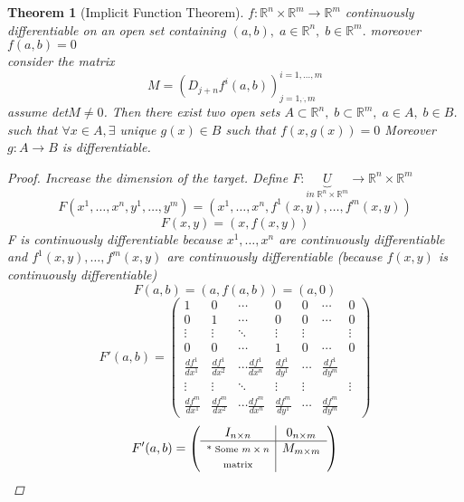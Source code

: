 \documentclass[12pt]{article}
\def\RR{\mathbb{R}}
\newtheorem{theorem}{Theorem}[section]
\begin{document}
\begin{theorem}[Implicit Function Theorem]\label{implicitFunction}
$f:\RR^n \times \RR^m \rightarrow \RR^m$ continuously differentiable on an open set containing $(a,b), \; a \in \RR^n , \; b \in \RR^m.$ moreover $f(a,b)=0$\\
consider the matrix \[M=(D_{j+n}f^{i}(a,b))^{i=1,\dots,m}_{j=1,\dot,m}\] assume det$M \neq 0$. Then there exist two open sets $A \subset \RR^n, \; b \subset \RR^m, \; a \in A, \; b \in B$. such that $\forall x \in A, \exists$ unique $g(x) \in B$ such that $f(x,g(x))=0$ Moreover $g:A \rightarrow B$ is differentiable.
\begin{proof} 
Increase the dimension of the target. Define $F:\underbrace{U}_{in \;  \RR^n \times \RR^m} \rightarrow \RR^n \times \RR^m$
\[F(x^1,\dots , x^n,y^1, \dots,y^m) = (x^1, \dots , x^n, f^1(x,y), \dots , f^m(x,y))\]
\[F(x,y) = (x,f(x,y))\]
F is continuously differentiable because $x^1 , \dots , x^n$ are continuously differentiable and $f^1(x,y), \dots , f^m(x,y)$ are continuously differentiable (because $f(x,y)$ is continuously differentiable)
\[F(a,b) = (a,f(a,b)) = (a,0)\]
\[
 F'(a,b) =
 \left( \begin{array}{cccc|ccc}
 1 & 0 & \cdots & 0 & 0 & \cdots & 0 \\
0 & 1 & \cdots & 0 & 0 & \cdots & 0 \\
  \vdots  & \vdots  & \ddots & \vdots & \vdots & & \vdots \\
0 & 0 & \cdots & 1 & 0 & \cdots & 0 \\
\hline
  \frac{df^1}{dx^1} & \frac{df^1}{dx^2}& \cdots\frac{df^1}{dx^n} & \frac{df^1}{dy^1} & \cdots & \frac{df^1}{dy^m}\\
\vdots  & \vdots  & \ddots & \vdots & \vdots & & \vdots \\
  \frac{df^m}{dx^1} & \frac{df^m}{dx^2}& \cdots\frac{df^m}{dx^n} & \frac{df^m}{dy^1} & \cdots & \frac{df^m}{dy^m}
 \end{array} \right)
\]
\[ F'(a,b) =
 \left( \begin{array}{c|c}
 I_{n \times n} & 0_{n \times m}\\
\hline
\text{\scriptsize * Some $m \times n$} & M_{m \times m}\\
\text{\scriptsize matrix} & 
 \end{array} \right) \]


\end{proof}
\end{theorem}
\end{document}
